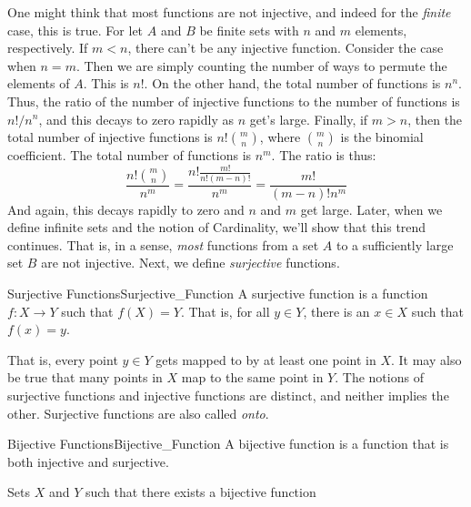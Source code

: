         One might think that most functions are not injective,
        and indeed for the \textit{finite} case, this is true.
        For let $A$ and $B$ be finite sets with $n$ and $m$
        elements, respectively. If $m<n$, there can't be
        any injective function. Consider the case when $n=m$.
        Then we are simply counting the number of ways to
        permute the elements of $A$. This is $n!$. On the
        other hand, the total number of functions is
        $n^{n}$. Thus, the ratio of the number of injective
        functions to the number of functions is
        $n!/n^{n}$, and this decays to zero rapidly as
        $n$ get's large. Finally, if $m>n$, then the total
        number of injective functions is
        $n!\binom{m}{n}$, where $\binom{m}{n}$ is the
        binomial coefficient. The total number of functions
        is $n^{m}$. The ratio is thus:
        \begin{equation}
            \frac{n!\binom{m}{n}}{n^{m}}=\frac{n!\frac{m!}{n!(m-n)!}}{n^{m}}
                                        =\frac{m!}{(m-n)!n^{m}}
        \end{equation}
        And again, this decays rapidly to zero and $n$ and $m$
        get large. Later, when we define infinite sets
        and the notion of Cardinality, we'll show that this
        trend continues. That is, in a sense, \textit{most}
        functions from a set $A$ to a sufficiently large set
        $B$ are not injective. Next, we define
        \textit{surjective} functions.
        \begin{ldefinition}{Surjective Functions}{Surjective_Function}
            A \gls{surjective function} is a function
            $f:X\rightarrow{Y}$ such that $f(X)=Y$.
            That is, for all $y\in{Y}$, there is an
            $x\in{X}$ such that $f(x)=y$.
        \end{ldefinition}
        That is, every point $y\in{Y}$ gets mapped to by
        at least one point in $X$. It may also be true that
        many points in $X$ map to the same point in $Y$.
        The notions of surjective functions and injective
        functions are distinct, and neither implies the
        other. Surjective functions are also called
        \textit{onto}.
        \begin{ldefinition}{Bijective Functions}{Bijective_Function}
            A \gls{bijective function} is a function
            that is both injective and surjective.
        \end{ldefinition}
        Sets $X$ and $Y$ such that there exists a bijective function
